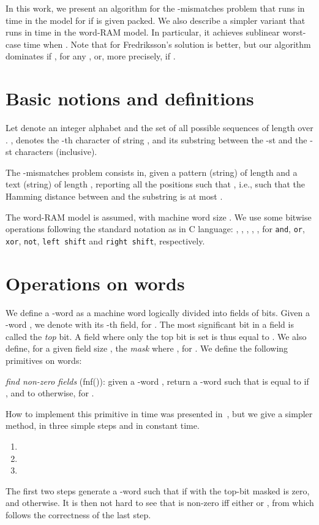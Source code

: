 \documentclass{llncs}
\newcommand{\fsize}{f}
\newcommand{\acbound}{\xspace}
\newcommand{\wrbound}{\xspace}
\newcommand{\fword}[1]{-word}
\begin{document}
In this work, we present an algorithm for the -mismatches problem
that runs in time \acbound in the  model for  if
 is given packed. We also describe a simpler variant that runs in
time \wrbound in the word-RAM model. In particular, it achieves
sublinear worst-case time when . Note that for  Fredriksson's solution is
better, but our algorithm dominates if , for any , or, more precisely, if .


\section{Basic notions and definitions}
\noindent
Let  denote an integer alphabet
and  the set of all possible
sequences of length  over .
, denotes the -th character of string , and
 its substring between the -st and the
-st characters (inclusive).

The -mismatches problem consists in, given a pattern (string) 
of length  and a text (string)  of length , reporting all the
positions  such that , i.e., such that the Hamming distance between
 and the substring 
is at most .

The word-RAM model is assumed, with machine word size . We use some bitwise operations following the standard notation as
in C language: , , , , ,  for
\texttt{and}, \texttt{or}, \texttt{xor}, \texttt{not}, \texttt{left
  shift} and \texttt{right shift}, respectively.

\section{Operations on words}

We define a \fword{f} as a machine word logically divided into
 fields of  bits. Given a \fword{f} ,
we denote with  its -th field, for
. The most significant bit in a field is
called the \emph{top} bit.
A field where only the top bit is set is thus equal to .
We also define, for a given field size
, the \emph{mask}  where , for . We define the following
primitives on words:

\medskip
\noindent\emph{find non-zero fields} (\textsf{fnf}()): given a
\fword{\fsize} , return a \fword{\fsize} 
such that  is equal to  if
, and to  otherwise, for
.
\smallskip

\noindent How to implement this primitive in  time was presented
in~\cite[Sect.~4]{BreslauerGG2012}, but we give a simpler method, in
three simple steps and in constant time.
\begin{enumerate}
\item 
\item 
\item 
\end{enumerate}
The first two steps generate a \fword{\log\sigma}  such
that  if  with the
top-bit masked is zero, and  otherwise. It is
then not hard to see that  is non-zero iff either
 or , from which follows the correctness of the last
step.
\end{document}
